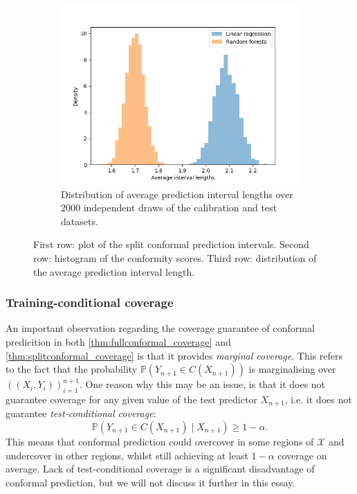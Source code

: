 \documentclass[11pt, titlepage]{article} %
\newcommand{\Prob}[1]{\mathbb{P}\left( #1 \right)}
\numberwithin{equation}{section}
\theoremstyle{definition}
\numberwithin{theorem}{section}
\numberwithin{lemma}{section}
\numberwithin{corollary}{section}
\numberwithin{proposition}{section}
\numberwithin{definition}{section}
\numberwithin{remark}{section}
\begin{document}
\begin{figure}[H]
\begin{subfigure}{0.49\textwidth}
        \includegraphics[width=\linewidth]{figures/2_3_lens.png}    
        \caption{Distribution of average prediction interval lengths over \(2000\) independent draws of the calibration and test datasets.} \label{fig:2_3_lens}
    \end{subfigure}
    \caption{First row: plot of the split conformal prediction intervals. Second row: histogram of the conformity scores. Third row: distribution of the average prediction interval length.}
\label{fig:2_3_example}
\end{figure}


\subsubsection{Training-conditional coverage}
\label{subsubsec:training_conditional_coverage}

An important observation regarding the coverage guarantee of conformal predicition in both \cref{thm:fullconformal_coverage} and \cref{thm:splitconformal_coverage} is that it provides \textit{marginal coverage}. This refers to the fact that the probability \(\Prob{Y_{n+1} \in C(X_{n+1})}\) is marginalising over \(((X_i, Y_i))_{i=1}^{n+1}.\) One reason why this may be an issue, is that it does not guarantee coverage for any given value of the test predictor \(X_{n+1}\), i.e. it does not guarantee \textit{test-conditional coverage}: \[\Prob{Y_{n+1} \in C(X_{n+1}) \mid X_{n+1}} \geq 1- \alpha.\] This means that conformal prediction could overcover in some regions of \(\mathcal{X}\) and undercover in other regions, whilst still achieving at least \(1-\alpha\) coverage on average. Lack of test-conditional coverage is a significant disadvantage of conformal prediction, but we will not discuss it further in this essay. \vskip5pt
\end{document}

